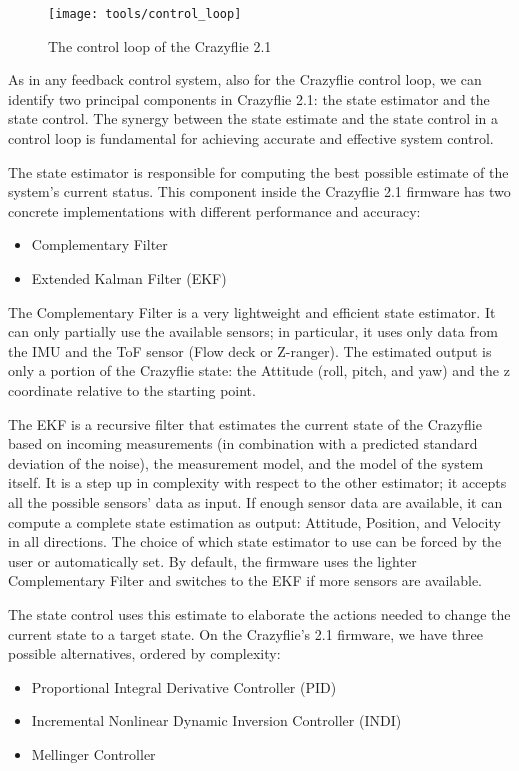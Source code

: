\begin{figure}[tb]
    \centering
    \texttt{[image: tools/control\_loop]}
    \caption[Crazyflie's control loop]{
        The control loop of the Crazyflie 2.1~\cite{bitcraze}
    }\label{fig:control_loop}
\end{figure}

As in any feedback control system, also for the Crazyflie control loop, we can identify two principal components in Crazyflie 2.1: the state estimator and the state control. 
The synergy between the state estimate and the state control in a control loop is fundamental for achieving accurate and effective system control. 

The state estimator is responsible for computing the best possible estimate of the system's current status.
This component inside the Crazyflie 2.1 firmware has two concrete implementations with different performance and accuracy:
\begin{itemize}
    \item Complementary Filter
    \item Extended Kalman Filter (EKF)
\end{itemize}

The Complementary Filter is a very lightweight and efficient state estimator. 
It can only partially use the available sensors; in particular, it uses only data from the IMU and the ToF sensor (Flow deck or Z-ranger).
The estimated output is only a portion of the Crazyflie state: the Attitude (roll, pitch, and yaw) and the z coordinate relative to the starting point.

The EKF is a recursive filter that estimates the current state of the Crazyflie based on incoming measurements (in combination with a predicted standard deviation of the noise), the measurement model, and the model of the system itself. 
It is a step up in complexity with respect to the other estimator; it accepts all the possible sensors' data as input. 
If enough sensor data are available, it can compute a complete state estimation as output: Attitude, Position, and Velocity in all directions.
The choice of which state estimator to use can be forced by the user or automatically set. 
By default, the firmware uses the lighter Complementary Filter and switches to the EKF if more sensors are available.

The state control uses this estimate to elaborate the actions needed to change the current state to a target state.
On the Crazyflie's 2.1 firmware, we have three possible alternatives, ordered by complexity:
\begin{itemize}
    \item Proportional Integral Derivative Controller (PID)
    \item Incremental Nonlinear Dynamic Inversion Controller (INDI)
    \item Mellinger Controller
\end{itemize}

